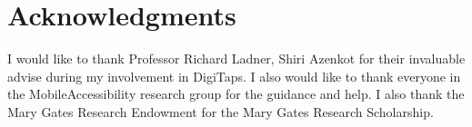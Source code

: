 \section{Acknowledgments}
\label{sec:acknowledge}
I would like to thank Professor Richard Ladner, Shiri Azenkot for their invaluable advise during my involvement in DigiTaps. I also would like to thank everyone in the MobileAccessibility research group for the guidance and help. I also thank the Mary Gates Research Endowment for the Mary Gates Research Scholarship.